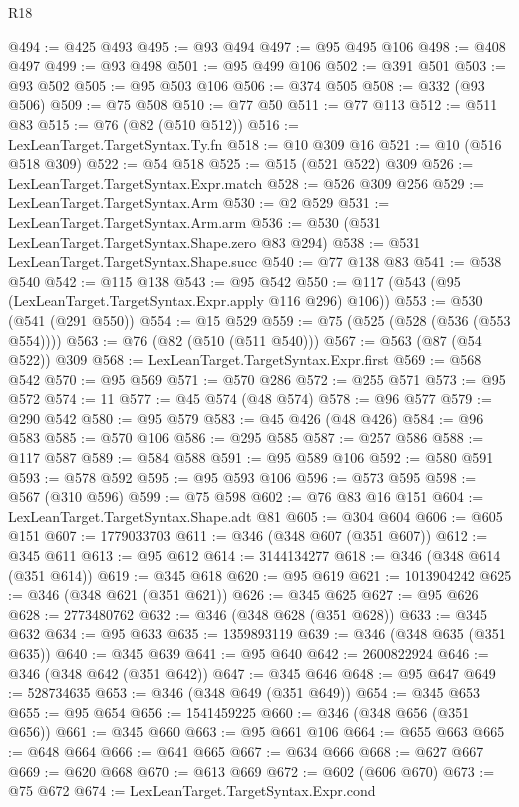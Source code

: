 \begin{lexlean}{R18}
\begin{coremodule}
@494 := @425 @493
@495 := @93 @494
@497 := @95 @495 @106
@498 := @408 @497
@499 := @93 @498
@501 := @95 @499 @106
@502 := @391 @501
@503 := @93 @502
@505 := @95 @503 @106
@506 := @374 @505
@508 := @332 (@93 @506)
@509 := @75 @508
@510 := @77 @50
@511 := @77 @113
@512 := @511 @83
@515 := @76 (@82 (@510 @512))
@516 := LexLeanTarget.TargetSyntax.Ty.fn
@518 := @10 @309 @16
@521 := @10 (@516 @518 @309)
@522 := @54 @518
@525 := @515 (@521 @522) @309
@526 := LexLeanTarget.TargetSyntax.Expr.match
@528 := @526 @309 @256
@529 := LexLeanTarget.TargetSyntax.Arm
@530 := @2 @529
@531 := LexLeanTarget.TargetSyntax.Arm.arm
@536 := @530 (@531 LexLeanTarget.TargetSyntax.Shape.zero @83 @294)
@538 := @531 LexLeanTarget.TargetSyntax.Shape.succ
@540 := @77 @138 @83
@541 := @538 @540
@542 := @115 @138
@543 := @95 @542
@550 := @117 (@543 (@95 (LexLeanTarget.TargetSyntax.Expr.apply @116 @296) @106))
@553 := @530 (@541 (@291 @550))
@554 := @15 @529
@559 := @75 (@525 (@528 (@536 (@553 @554))))
@563 := @76 (@82 (@510 (@511 @540)))
@567 := @563 (@87 (@54 @522)) @309
@568 := LexLeanTarget.TargetSyntax.Expr.first
@569 := @568 @542
@570 := @95 @569
@571 := @570 @286
@572 := @255 @571
@573 := @95 @572
@574 := 11
@577 := @45 @574 (@48 @574)
@578 := @96 @577
@579 := @290 @542
@580 := @95 @579
@583 := @45 @426 (@48 @426)
@584 := @96 @583
@585 := @570 @106
@586 := @295 @585
@587 := @257 @586
@588 := @117 @587
@589 := @584 @588
@591 := @95 @589 @106
@592 := @580 @591
@593 := @578 @592
@595 := @95 @593 @106
@596 := @573 @595
@598 := @567 (@310 @596)
@599 := @75 @598
@602 := @76 @83 @16 @151
@604 := LexLeanTarget.TargetSyntax.Shape.adt @81
@605 := @304 @604
@606 := @605 @151
@607 := 1779033703
@611 := @346 (@348 @607 (@351 @607))
@612 := @345 @611
@613 := @95 @612
@614 := 3144134277
@618 := @346 (@348 @614 (@351 @614))
@619 := @345 @618
@620 := @95 @619
@621 := 1013904242
@625 := @346 (@348 @621 (@351 @621))
@626 := @345 @625
@627 := @95 @626
@628 := 2773480762
@632 := @346 (@348 @628 (@351 @628))
@633 := @345 @632
@634 := @95 @633
@635 := 1359893119
@639 := @346 (@348 @635 (@351 @635))
@640 := @345 @639
@641 := @95 @640
@642 := 2600822924
@646 := @346 (@348 @642 (@351 @642))
@647 := @345 @646
@648 := @95 @647
@649 := 528734635
@653 := @346 (@348 @649 (@351 @649))
@654 := @345 @653
@655 := @95 @654
@656 := 1541459225
@660 := @346 (@348 @656 (@351 @656))
@661 := @345 @660
@663 := @95 @661 @106
@664 := @655 @663
@665 := @648 @664
@666 := @641 @665
@667 := @634 @666
@668 := @627 @667
@669 := @620 @668
@670 := @613 @669
@672 := @602 (@606 @670)
@673 := @75 @672
@674 := LexLeanTarget.TargetSyntax.Expr.cond

\end{coremodule}
\end{lexlean}
